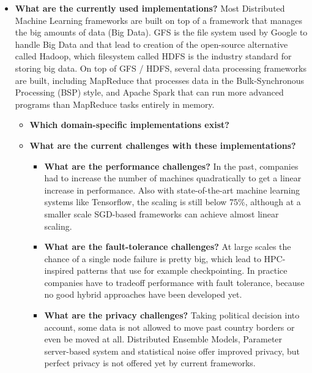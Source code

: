 \begin{itemize}
	\item \textbf{What are the currently used implementations?} Most Distributed Machine Learning frameworks are built on top of a framework that manages the big amounts of data (Big Data). GFS is the file system used by Google to handle Big Data and that lead to creation of the open-source alternative called Hadoop, which filesystem called HDFS is the industry standard for storing big data. On top of GFS / HDFS, several data processing frameworks are built, including MapReduce that processes data in the Bulk-Synchronous Processing (BSP) style, and Apache Spark that can run more advanced programs than MapReduce tasks entirely in memory.
	\begin{itemize}
		\item \textbf{Which domain-specific implementations exist?}
		\item \textbf{What are the current challenges with these implementations?}
		\begin{itemize}
			\item \textbf{What are the performance challenges?} In the past, companies had to increase the number of machines quadratically to get a linear increase in performance. Also with state-of-the-art machine learning systems like Tensorflow, the scaling is still below 75\%, although at a smaller scale SGD-based frameworks can achieve almost linear scaling.
			\item \textbf{What are the fault-tolerance challenges?} At large scales the chance of a single node failure is pretty big, which lead to HPC-inspired patterns that use for example checkpointing. In practice companies have to tradeoff performance with fault tolerance, because no good hybrid approaches have been developed yet.
			\item \textbf{What are the privacy challenges?} Taking political decision into account, some data is not allowed to move past country borders or even be moved at all. Distributed Ensemble Models, Parameter server-based system and statistical noise offer improved privacy, but perfect privacy is not offered yet by current frameworks.
		\end{itemize}
	\end{itemize}
\end{itemize}
